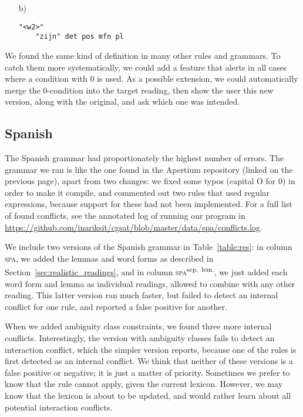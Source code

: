 {{\begin{itemize}
\item[b)] \begin{verbatim}
"<w2>"
    "zijn" det pos mfn pl
\end{verbatim}
\end{itemize}


We found the same kind of definition in many other rules and grammars.
To catch them more systematically, we could add a feature that alerts in all cases where a condition with 0 is used. As a possible extension, we could automatically merge the 0-condition into the target reading, then show the user this new version, along with the original, and ask which one was intended.


\subsection{Spanish} The Spanish grammar had proportionately the
highest number of errors. The grammar we ran is like the one
found in the Apertium repository (linked on the previous page),
apart from two changes: we fixed some typos (capital O for 0) in
order to make it compile, and commented out two rules that used
regular expressions, because support for these had not been implemented.
For a full list of found conflicts, see the annotated log of running
our program in \url{https://github.com/inariksit/cgsat/blob/master/data/spa/conflicts.log}.


We include two versions of the Spanish grammar in Table~\ref{table:res}: in column \textsc{spa}, we added the lemmas and word forms as described in Section~\ref{sec:realistic_readings}, and in column \textsc{spa}\textsuperscript{sep.~lem.}, we just added each word form and lemma as individual readings, allowed to combine with any other reading.
This latter version ran much faster, but failed to detect an internal conflict for one rule, and reported a false positive for another.

When we added ambiguity class constraints, we found three more internal conflicts.
Interestingly, the version with ambiguity classes fails to detect an interaction conflict, which the simpler version reports, because one of the rules is first detected as an internal conflict.
We think that neither of these versions is a false positive or negative; it is just a matter of priority. Sometimes we prefer to know that the rule cannot apply, given the current lexicon.
However, we may know that the lexicon is about to be updated, and would rather learn about all potential interaction conflicts.

}}

